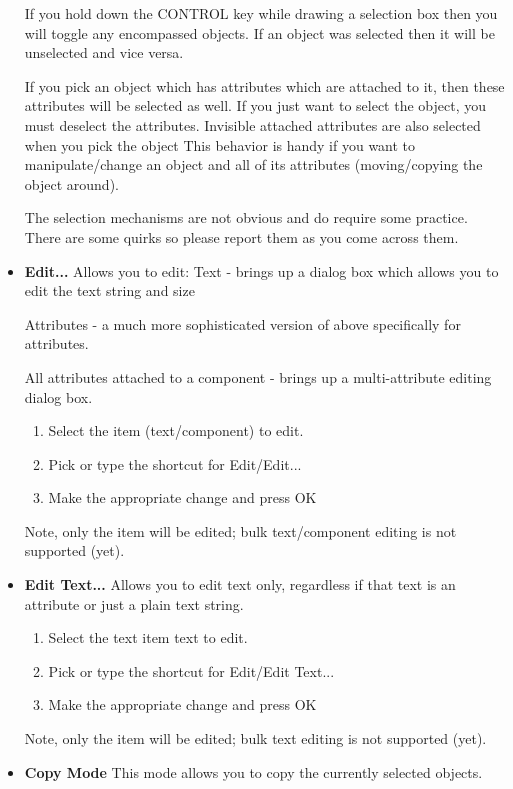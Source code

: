 \documentclass{article}
\begin{document}
\begin{itemize}
  If you hold down the CONTROL key while drawing a selection box then
  you will toggle any encompassed objects.  If an object was selected
  then it will be unselected and vice versa.
  
  If you pick an object which has attributes which are attached to it,
  then these attributes will be selected as well.  If you just want to
  select the object, you must deselect the attributes.  Invisible
  attached attributes are also selected when you pick the object This
  behavior is handy if you want to manipulate/change an object and all
  of its attributes (moving/copying the object around).
  
  The selection mechanisms are not obvious and do require some
  practice.  There are some quirks so please report them as you come
  across them.
  
\item {\bf Edit...}  Allows you to edit: Text - brings up a dialog box
  which allows you to edit the text string and size
  
  Attributes - a much more sophisticated version of above specifically
  for attributes.
  
  All attributes attached to a component - brings up a multi-attribute
  editing dialog box.

\begin{enumerate}
\item Select the item (text/component) to edit.
\item Pick or type the shortcut for Edit/Edit...
\item Make the appropriate change and press OK
\end{enumerate}
Note, only the item will be edited; bulk text/component editing is not
supported (yet).

\item {\bf Edit Text...}  Allows you to edit text only, regardless if
  that text is an attribute or just a plain text string.
\begin{enumerate}
\item Select the text item text to edit.
\item Pick or type the shortcut for Edit/Edit Text...
\item Make the appropriate change and press OK
\end{enumerate}
Note, only the item will be edited; bulk text editing is not supported
(yet).

\item {\bf Copy Mode} This mode allows you to copy the currently
  selected objects.
  

\end{itemize}
\end{document}
